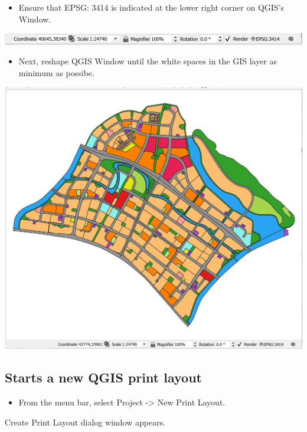\documentclass[
  letterpaper,
  DIV=11,
  numbers=noendperiod]{scrreprt}
\providecommand{\tightlist}{%
  \setlength{\itemsep}{0pt}\setlength{\parskip}{0pt}}\usepackage{longtable,booktabs,array}
\begin{document}
\begin{itemize}
\tightlist
\item
  Ensure that EPSG: 3414 is indicated at the lower right corner on
  QGIS's Window.
\end{itemize}

\includegraphics{./img04/image42.jpg}

\begin{itemize}
\tightlist
\item
  Next, reshape QGIS Window until the white spaces in the GIS layer as
  minimum as possibe.
\end{itemize}

\includegraphics{./img04/image43.jpg}

\hypertarget{starts-a-new-qgis-print-layout}{%
\subsection{Starts a new QGIS print
layout}\label{starts-a-new-qgis-print-layout}}

\begin{itemize}
\tightlist
\item
  From the menu bar, select Project -\textgreater{} New Print Layout.
\end{itemize}

Create Print Layout dialog window appears.
\end{document}
